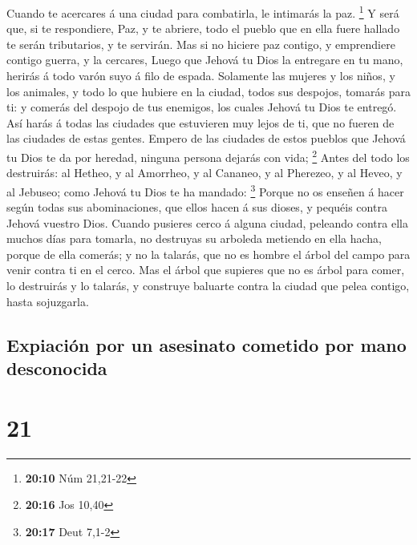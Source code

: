  Cuando te acercares á una ciudad para combatirla, le
intimarás la paz. \footnote{\textbf{20:10} Núm 21,21-22}  Y
será que, si te respondiere, Paz, y te abriere, todo el pueblo que en
ella fuere hallado te serán tributarios, y te servirán. 
Mas si no hiciere paz contigo, y emprendiere contigo guerra, y la
cercares,  Luego que Jehová tu Dios la entregare en tu
mano, herirás á todo varón suyo á filo de espada. 
Solamente las mujeres y los niños, y los animales, y todo lo que hubiere
en la ciudad, todos sus despojos, tomarás para ti: y comerás del despojo
de tus enemigos, los cuales Jehová tu Dios te entregó.  Así
harás á todas las ciudades que estuvieren muy lejos de ti, que no fueren
de las ciudades de estas gentes.  Empero de las ciudades de
estos pueblos que Jehová tu Dios te da por heredad, ninguna persona
dejarás con vida; \footnote{\textbf{20:16} Jos 10,40} 
Antes del todo los destruirás: al Hetheo, y al Amorrheo, y al Cananeo, y
al Pherezeo, y al Heveo, y al Jebuseo; como Jehová tu Dios te ha
mandado: \footnote{\textbf{20:17} Deut 7,1-2}  Porque no os
enseñen á hacer según todas sus abominaciones, que ellos hacen á sus
dioses, y pequéis contra Jehová vuestro Dios.  Cuando
pusieres cerco á alguna ciudad, peleando contra ella muchos días para
tomarla, no destruyas su arboleda metiendo en ella hacha, porque de ella
comerás; y no la talarás, que no es hombre el árbol del campo para venir
contra ti en el cerco.  Mas el árbol que supieres que no es
árbol para comer, lo destruirás y lo talarás, y construye baluarte
contra la ciudad que pelea contigo, hasta sojuzgarla.

\hypertarget{expiaciuxf3n-por-un-asesinato-cometido-por-mano-desconocida}{%
\subsection{Expiación por un asesinato cometido por mano
desconocida}\label{expiaciuxf3n-por-un-asesinato-cometido-por-mano-desconocida}}

\hypertarget{section-20}{%
\section{21}\label{section-20}}

